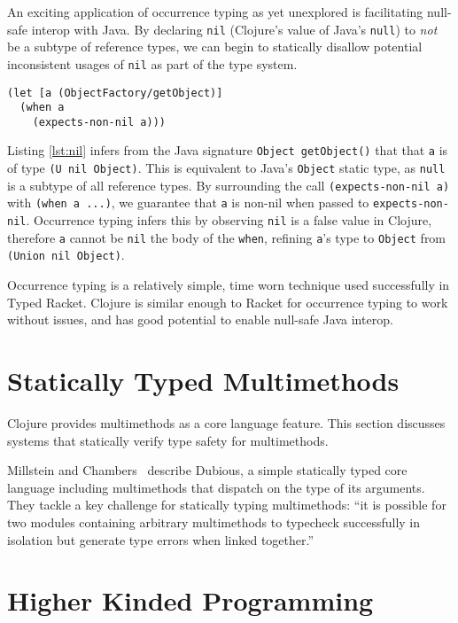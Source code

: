 An exciting application of occurrence typing as yet unexplored is facilitating null-safe interop with Java.
By declaring \lstinline|nil| (Clojure's value of Java's \lstinline|null|) to \emph{not} be a subtype of reference types,
we can begin to statically disallow potential inconsistent usages of \lstinline|nil| as part of the type system.

\begin{lstlisting}[caption=Observing nil-checks using occurrence typing, label=lst:nil]
(let [a (ObjectFactory/getObject)]
  (when a
    (expects-non-nil a)))
\end{lstlisting}

Listing \ref{lst:nil} infers from the Java signature \lstinline|Object getObject()| that
that \lstinline|a| is of type \lstinline|(U nil Object)|. This is equivalent to Java's
\lstinline|Object| static type, as \lstinline|null| is a subtype of all reference types. By surrounding
the call \lstinline|(expects-non-nil a)| with \lstinline|(when a ...)|, we guarantee that
\lstinline|a| is non-nil when passed to \lstinline|expects-non-nil|. Occurrence typing infers
this by observing \lstinline|nil| is a false value in Clojure, therefore \lstinline|a| cannot
be \lstinline|nil| the body of the \lstinline|when|, refining \lstinline|a|'s type to \lstinline|Object|
from \lstinline|(Union nil Object)|.

Occurrence typing is a relatively simple, time worn technique used successfully 
in Typed Racket. Clojure is similar enough to Racket for occurrence typing to work
without issues, and has good potential to enable null-safe Java interop.

\section{Statically Typed Multimethods}

Clojure provides multimethods as a core language feature. This section discusses systems that statically
verify type safety for multimethods.

Millstein and Chambers~\cite{MS02}
describe Dubious, a simple statically typed core language including multimethods that
dispatch on the type of its arguments. They tackle a key challenge for statically typing
multimethods: ``it is possible for two modules containing arbitrary multimethods to typecheck
successfully in isolation but generate type errors when linked together.''~\cite{MS02}

\section{Higher Kinded Programming}

